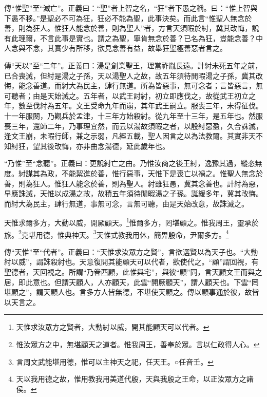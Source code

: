 {\noindent\zhuan{}\fzbyks 傳“惟聖”至“滅亡”。正義曰：“聖”者上智之名，“狂”者下愚之稱。曰：“惟上智與下愚不移。”是聖必不可為狂，狂必不能為聖，此事決矣。而此言“惟聖人無念於善，則為狂人。惟狂人能念於善，則為聖人”者，方言天須暇於紂，冀其改悔，說有此理爾，不言此事是實也。謂之為聖，寧肯無念於善？已名為狂，豈能念善？中人念與不念，其實少有所移，欲見念善有益，故舉狂聖極善惡者言之。 \par}

{\noindent\zhuan{}\fzbyks 傳“天以”至“二年”。正義曰：湯是創業聖王，理當祚胤長遠。計紂未死五年之前，已合喪滅，但紂是湯之子孫，天以湯聖人之故，故五年須待閒暇湯之子孫，冀其改悔，能念善道。而紂大為民主，肆行無道。所為皆惡事，無可念者；言皆惡言，無可聽者；由是天始滅之。五年者，以武王討紂，初立即應伐之，故從武王初立之年，數至伐紂為五年。文王受命九年而崩，其年武王嗣立。服喪三年，未得征伐。十一年服闋，乃觀兵於孟津，十三年方始殺紂。從九年至十三年，是五年也。然服喪三年，還師二年，乃事理宜然，而云以湯故須暇之者，以殷紂惡盈，久合誅滅，逢文王崩，未暇行師，兼之示弱，凡經五載，聖人因言之以為法教爾。其實非天不知紂狂，望其後改悔，亦非曲念湯德，延此歲年也。 \par}

{\noindent\shu{}\fzkt “乃惟”至“念聽”。正義曰：更說紂亡之由。乃惟汝商之後王紂，逸豫其過，縱恣無度。紂謀其為政，不能絜進於善，惟行惡事，天惟下是喪亡以禍之。惟聖人無念於善，則為狂人。惟狂人能念於善，則為聖人。紂雖狂愚，冀其念善也。計紂為惡，早應誅滅，天惟以成湯之故，故積五年須待閒暇湯之子孫。誕緩多年，冀其改悔。而紂大為民主，肆行無道，事無可念，言無可聽，由是天始改意，故誅滅之。 \par}

天惟求爾多方，大動以威，開厥顧天。\footnote{天惟求汝眾方之賢者，大動紂以威，開其能顧天可以代者。}惟爾多方，罔堪顧之。惟我周王，靈承於旅。\footnote{惟汝眾方之中，無堪顧天之道者。惟我周王，善奉於眾。言以仁政得人心。}克堪用德，惟典神天。\footnote{言周文武能堪用德，惟可以主神天之祀，任天王。○任音壬。}天惟式教我用休，簡畀殷命，尹爾多方。\footnote{天以我用德之故，惟用教我用美道代殷，天與我殷之王命，以正汝眾方之諸侯。}


{\noindent\zhuan{}\fzbyks 傳“天惟”至“代者”。正義曰：“天惟求汝眾方之賢”，言欲選賢以為天子也。“大動紂以威”，謂誅殺紂也。天意復開其能顧天可以代者，欲使代之。“顧”謂回視，有聖德者，天回視之。所謂“乃眷西顧，此惟與宅”，與彼“顧”同，言天顧文王而與之居，即此意也。但謂天顧人，人亦顧天，此雲“開厥顧天”，謂人顧天也。下雲“罔堪顧之”，謂天顧人也。言多方人皆無德，不堪使天顧之。傳以顧事通於彼，故皆以天言之。 \par}

